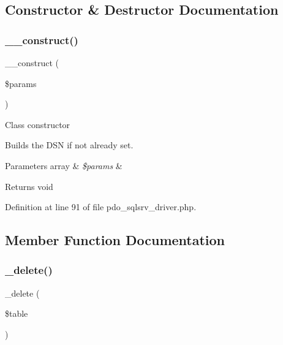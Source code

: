 \subsection{Constructor \& Destructor Documentation}
\mbox{\label{class_c_i___d_b__pdo__sqlsrv__driver_a9162320adff1a1a4afd7f2372f753a3e}} 
\subsubsection{\texorpdfstring{\_\_construct()}{\_\_construct()}}
{\footnotesize\ttfamily \+\_\+\+\_\+construct (\begin{DoxyParamCaption}\item[{}]{\$params }\end{DoxyParamCaption})}

Class constructor

Builds the D\+SN if not already set.


\begin{DoxyParams}[1]{Parameters}
array & {\em \$params} & \\
\hline
\end{DoxyParams}
\begin{DoxyReturn}{Returns}
void 
\end{DoxyReturn}


Definition at line 91 of file pdo\+\_\+sqlsrv\+\_\+driver.\+php.



\subsection{Member Function Documentation}
\mbox{\label{class_c_i___d_b__pdo__sqlsrv__driver_a133ea8446ded52589bd22cc9163d0896}} 
\subsubsection{\texorpdfstring{\_delete()}{\_delete()}}
{\footnotesize\ttfamily \+\_\+delete (\begin{DoxyParamCaption}\item[{}]{\$table }\end{DoxyParamCaption})\hspace{0.3cm}{\ttfamily [protected]}}

